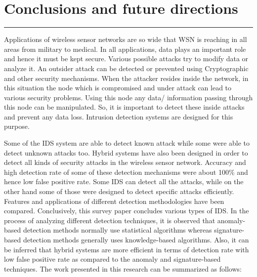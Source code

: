 \chapter{Conclusions and future directions}
\label{C7} %
\noindent\rule{\linewidth}{2pt}
Applications of wireless sensor networks are so wide that WSN is reaching in all areas from military to medical. In all applications, data plays an important role and hence it must be kept secure. Various possible attacks try to modify data or analyze it. An outsider attack can be detected or prevented using Cryptographic and other security mechanisms. When the attacker resides inside the network, in this situation the node which is compromised and under attack can lead to various security problems. Using this node any data/ information passing through this node can be manipulated. So, it is important to detect these inside attacks and prevent any data loss. Intrusion detection systems are designed for this purpose.
\par Some of the IDS system are able to detect known attack while some were able to detect unknown attacks too. Hybrid systems have also been designed in order to detect all kinds of security attacks in the wireless sensor network. Accuracy and high detection rate of some of these detection mechanisms were about 100\% and hence low false positive rate. Some IDS can detect all the attacks, while on the other hand some of those were designed to detect specific attacks efficiently. Features and applications of different detection methodologies have been compared. Conclusively, this survey paper concludes various types of IDS. In the process of analyzing different detection techniques, it is observed that anomaly-based detection methods normally use statistical algorithms whereas signature-based detection methods generally uses knowledge-based algorithms. Also, it can be inferred that hybrid systems are more efficient in terms of detection rate with low false positive rate as compared to the anomaly and signature-based techniques. The work presented in this research can be summarized as follows:
